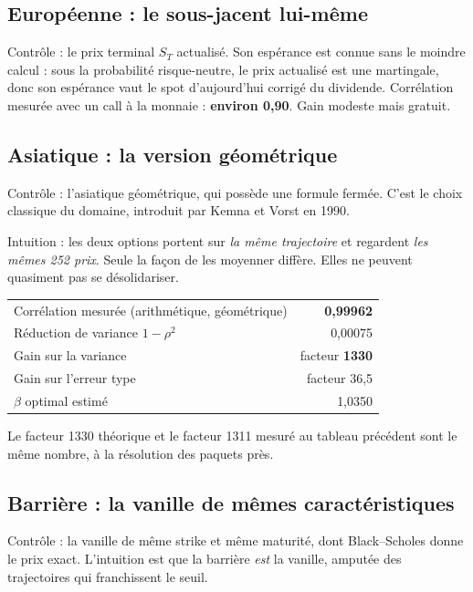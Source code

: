 \documentclass[11pt,a4paper]{article}
\begin{document}
\subsection{Européenne : le sous-jacent lui-même}

Contrôle : le prix terminal $S_T$ actualisé. Son espérance est connue sans le
moindre calcul : sous la probabilité risque-neutre, le prix actualisé est une
martingale, donc son espérance vaut le spot d'aujourd'hui corrigé du dividende.
Corrélation mesurée avec un call à la monnaie : \textbf{environ 0,90}. Gain
modeste mais gratuit.

\subsection{Asiatique : la version géométrique}

Contrôle : l'asiatique géométrique, qui possède une formule fermée. C'est le
choix classique du domaine, introduit par Kemna et Vorst en 1990.

Intuition : les deux options portent sur \emph{la même trajectoire} et
regardent \emph{les mêmes 252 prix}. Seule la façon de les moyenner diffère.
Elles ne peuvent quasiment pas se désolidariser.

\begin{center}
\small
\begin{tabular}{lr}
\toprule
Corrélation mesurée (arithmétique, géométrique) & \textbf{0,99962} \\
Réduction de variance $1-\rho^2$ & 0,00075 \\
Gain sur la variance & facteur \textbf{1330} \\
Gain sur l'erreur type & facteur 36,5 \\
$\beta$ optimal estimé & 1,0350 \\
\bottomrule
\end{tabular}
\end{center}

Le facteur 1330 théorique et le facteur 1311 mesuré au tableau précédent sont
le même nombre, à la résolution des paquets près.

\subsection{Barrière : la vanille de mêmes caractéristiques}

Contrôle : la vanille de même strike et même maturité, dont Black--Scholes donne
le prix exact. L'intuition est que la barrière \emph{est} la vanille, amputée
des trajectoires qui franchissent le seuil.
\end{document}
